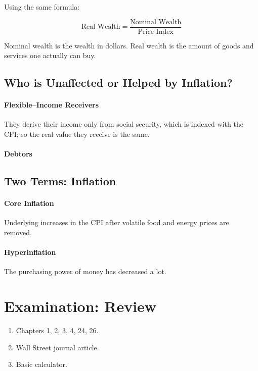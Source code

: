 Using the same formula:

\[
	\text{Real Wealth} = \frac{\text{Nominal Wealth}}{\text{Price Index}}
\]

Nominal wealth is the wealth in dollars. Real wealth is the amount of goods and services one actually can buy.

\subsection{Who is Unaffected or Helped by Inflation?}

\paragraph{Flexible--Income Receivers} They derive their income only from social security, which is indexed with the CPI; so the real value they receive is the same.

\paragraph{Debtors} 

\subsection{Two Terms: Inflation}

\paragraph{Core Inflation} Underlying increases in the CPI after volatile food and energy prices are removed.

\paragraph{Hyperinflation} 
The purchasing power of money has decreased a lot.

\newpage
\section{Examination: Review}


\begin{enumerate}[label = \textbullet]
	\item Chapters 1, 2, 3, 4, 24, 26.

	\item Wall Street journal article.

	\item Basic calculator.
\end{enumerate}

